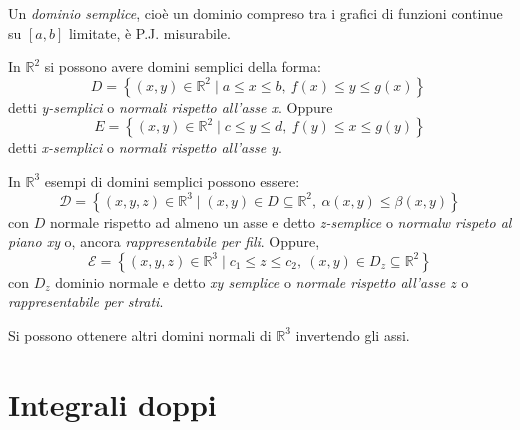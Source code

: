 \begin{example}
    Un \textit{dominio semplice}, cioè un dominio compreso tra i grafici di funzioni continue su $\left[a,b\right]$ limitate, è P.J. misurabile.
    
    In $\mathbb{R}^2$ si possono avere domini semplici della forma:
    \begin{equation*}
            D= \left\{ (x, y) \in \mathbb{R}^2 \mid a \leq x \leq b ,\ f(x)\leq y \leq g(x) \right\}\        
    \end{equation*}
    detti \textit{y-semplici} o \textit{normali rispetto all'asse x}. Oppure
    \begin{equation*}
        E= \left\{(x, y) \in \mathbb{R}^2\mid c \leq y \leq d,\ f(y) \leq x \leq g(y)\right\}
    \end{equation*}
    detti \textit{x-semplici} o \textit{normali rispetto all'asse y}.
    \vspace*{6pt}                       
    
    In $\mathbb{R}^3$ esempi di domini semplici possono essere:
    \begin{equation*}
        \mathcal{D}=\left\{(x,y,z) \in \mathbb{R}^3 \mid (x,y) \in D \subseteq \mathbb{R}^2,\ \alpha(x, y) \leq \beta(x,y) \right\}
    \end{equation*}
    con $D$ normale rispetto ad almeno un asse e detto \textit{z-semplice} o \textit{normalw rispeto al piano xy} o, ancora \textit{rappresentabile per fili}. Oppure, 
    \begin{equation*}
        \mathcal{E}=\left\{(x,y,z) \in \mathbb{R}^3 \mid c_1 \leq z \leq c_2,\ (x,y) \in D_z\subseteq \mathbb{R}^2\right\}
    \end{equation*}
    con $D_z$ dominio normale e detto \textit{xy semplice} o \textit{normale rispetto all'asse $z$} o \textit{rappresentabile per strati}.
    \begin{oss}
        Si possono ottenere altri domini normali di $\mathbb{R}^3$ invertendo gli assi.
    \end{oss}
\end{example}
\section{Integrali doppi}


